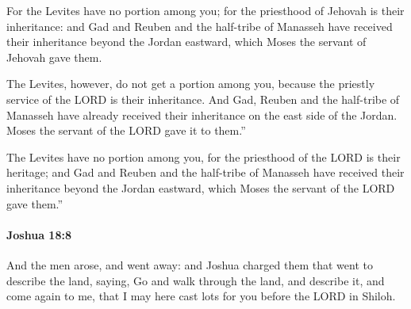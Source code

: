			\begin{versebox}
					\item[BHS] 
					\item[ASV] For the Levites have no portion among you; for the priesthood of Jehovah is their inheritance: and Gad and Reuben and the half-tribe of Manasseh have received their inheritance beyond the Jordan eastward, which Moses the servant of Jehovah gave them.
					\item[NIV] The Levites, however, do not get a portion among you, because the priestly service of the LORD is their inheritance. And Gad, Reuben and the half-tribe of Manasseh have already received their inheritance on the east side of the Jordan. Moses the servant of the LORD gave it to them.”
					\item[NRSV] The Levites have no portion among you, for the priesthood of the LORD is their heritage; and Gad and Reuben and the half-tribe of Manasseh have received their inheritance beyond the Jordan eastward, which Moses the servant of the LORD gave them.”
			\end{versebox}

		\paragraph{Joshua 18:8} %
			\label{JOSHUA-18-8}

			And the men arose, and went away: and Joshua charged them that went to describe the land, saying, Go and walk through the land, and describe it, and come again to me, that I may here cast lots for you before the LORD in Shiloh.

